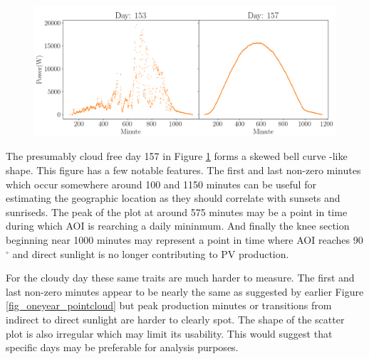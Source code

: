 \newpage
\begin{figure}[h!]
\centering
\includegraphics[width=1\linewidth]{pics/twodayshelsinki}
\label{fig_cloudfree_vs_cloudy}
\end{figure}

\noindent The presumably cloud free day 157 in Figure \ref{fig_cloudfree_vs_cloudy} forms a skewed bell curve -like shape. This figure has a few notable features. The first and last non-zero minutes which occur somewhere around 100 and 1150 minutes can be useful for estimating the geographic location as they should correlate with sunsets and sunriseds. The peak of the plot at around 575 minutes may be a point in time during which AOI is rearching a daily mininmum. And finally the knee section beginning near 1000 minutes may represent a point in time where AOI reaches 90$^\circ$ and direct sunlight is no longer contributing to PV production.

For the cloudy day these same traits are much harder to measure. The first and last non-zero minutes appear to be nearly the same as suggested by earlier Figure \ref{fig_oneyear_pointcloud} but peak production minutes or transitions from indirect to direct sunlight are harder to clearly spot. The shape of the scatter plot is also irregular which may limit its usability. This would suggest that specific days may be preferable for analysis purposes.




\newpage

